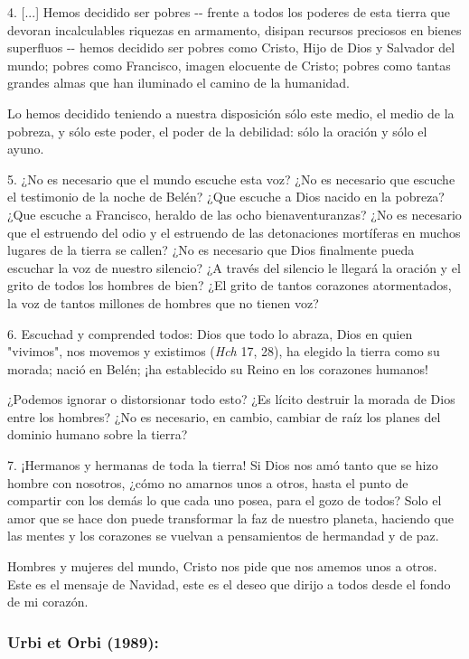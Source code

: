 4. {[}...{]} Hemos decidido ser pobres -\/- frente a todos los poderes
de esta tierra que devoran incalculables riquezas en armamento, disipan
recursos preciosos en bienes superfluos -\/- hemos decidido ser pobres
como Cristo, Hijo de Dios y Salvador del mundo; pobres como Francisco,
imagen elocuente de Cristo; pobres como tantas grandes almas que han
iluminado el camino de la humanidad.

Lo hemos decidido teniendo a nuestra disposición sólo este medio, el
medio de la pobreza, y sólo este poder, el poder de la debilidad: sólo
la oración y sólo el ayuno.

5. ¿No es necesario que el mundo escuche esta voz? ¿No es necesario que
escuche el testimonio de la noche de Belén? ¿Que escuche a Dios nacido
en la pobreza? ¿Que escuche a Francisco, heraldo de las ocho
bienaventuranzas? ¿No es necesario que el estruendo del odio y el
estruendo de las detonaciones mortíferas en muchos lugares de la tierra
se callen? ¿No es necesario que Dios finalmente pueda escuchar la voz de
nuestro silencio? ¿A través del silencio le llegará la oración y el
grito de todos los hombres de bien? ¿El grito de tantos corazones
atormentados, la voz de tantos millones de hombres que no tienen voz?

6. Escuchad y comprended todos: Dios que todo lo abraza, Dios en quien
"vivimos", nos movemos y existimos (\emph{Hch} 17, 28), ha elegido la
tierra como su morada; nació en Belén; ¡ha establecido su Reino en los
corazones humanos!

¿Podemos ignorar o distorsionar todo esto? ¿Es lícito destruir la morada
de Dios entre los hombres? ¿No es necesario, en cambio, cambiar de raíz
los planes del dominio humano sobre la tierra?

7. ¡Hermanos y hermanas de toda la tierra! Si Dios nos amó tanto que se
hizo hombre con nosotros, ¿cómo no amarnos unos a otros, hasta el punto
de compartir con los demás lo que cada uno posea, para el gozo de todos?
Solo el amor que se hace don puede transformar la faz de nuestro
planeta, haciendo que las mentes y los corazones se vuelvan a
pensamientos de hermandad y de paz.

Hombres y mujeres del mundo, Cristo nos pide que nos amemos unos a
otros. Este es el mensaje de Navidad, este es el deseo que dirijo a
todos desde el fondo de mi corazón.

\subsubsection{Urbi et Orbi (1989): }


